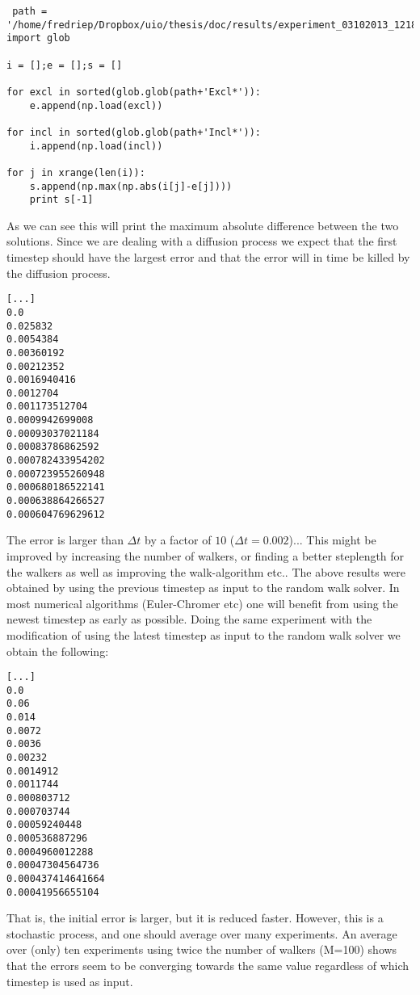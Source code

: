 \begin{lstlisting}
 path = '/home/fredriep/Dropbox/uio/thesis/doc/results/experiment_03102013_1218/results/'
import glob

i = [];e = [];s = []

for excl in sorted(glob.glob(path+'Excl*')):
	e.append(np.load(excl))

for incl in sorted(glob.glob(path+'Incl*')):
	i.append(np.load(incl))

for j in xrange(len(i)):
	s.append(np.max(np.abs(i[j]-e[j])))
	print s[-1]
\end{lstlisting}
As we can see this will print the maximum absolute difference between the two solutions. 
Since we are dealing with a diffusion process we expect that the first timestep should have the largest error and that the error will in time be killed by the diffusion process. 
\begin{lstlisting}
[...]
0.0
0.025832
0.0054384
0.00360192
0.00212352
0.0016940416
0.0012704
0.001173512704
0.0009942699008
0.00093037021184
0.00083786862592
0.000782433954202
0.000723955260948
0.000680186522141
0.000638864266527
0.000604769629612

\end{lstlisting}
The error is larger than $\Delta t$ by a factor of $10$ ($\Delta t = 0.002$)... 
This might be improved by increasing the number of walkers, or finding a better steplength for the walkers as well as improving the walk-algorithm etc..
The above results were obtained by using the previous timestep as input to the random walk solver. 
In most numerical algorithms (Euler-Chromer etc) one will benefit from using the newest timestep as early as possible. 
Doing the same experiment with the modification of using the latest timestep as input to the random walk solver we obtain the following:
\begin{lstlisting}
[...]
0.0
0.06
0.014
0.0072
0.0036
0.00232
0.0014912
0.0011744
0.000803712
0.000703744
0.00059240448
0.000536887296
0.0004960012288
0.00047304564736
0.000437414641664
0.00041956655104
\end{lstlisting}
That is, the initial error is larger, but it is reduced faster. 
However, this is a stochastic process, and one should average over many experiments. 
An average over (only) ten experiments using twice the number of walkers (M=100) shows that the errors seem to be converging towards the same value regardless of which timestep is used as input.

